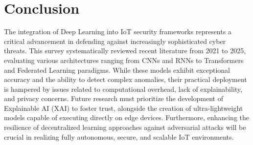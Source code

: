 \documentclass[conference]{IEEEtran}
\begin{document}
\section{Conclusion}
The integration of Deep Learning into IoT security frameworks represents a critical advancement in defending against increasingly sophisticated cyber threats. This survey systematically reviewed recent literature from 2021 to 2025, evaluating various architectures ranging from CNNs and RNNs to Transformers and Federated Learning paradigms. While these models exhibit exceptional accuracy and the ability to detect complex anomalies, their practical deployment is hampered by issues related to computational overhead, lack of explainability, and privacy concerns. Future research must prioritize the development of Explainable AI (XAI) to foster trust, alongside the creation of ultra-lightweight models capable of executing directly on edge devices. Furthermore, enhancing the resilience of decentralized learning approaches against adversarial attacks will be crucial in realizing fully autonomous, secure, and scalable IoT environments.



\end{document}
